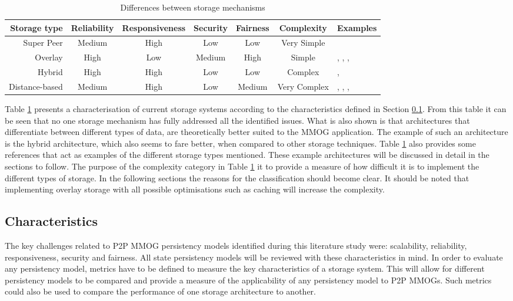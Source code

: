 \documentclass[10pt,a4paper,journal,cspaper,compsoc]{IEEEtran}
\begin{document}
\begin{table}[htbp]
\centering
\begin{tabular}{|r|c|c|c|c|c|l|}
\hline
Storage type & Reliability & Responsiveness & Security & Fairness & Complexity & Examples\\
\hline
Super Peer & Medium & High & Low & Low & Very Simple & \cite{knutsson_p2p_first}\\
Overlay & High & Low & Medium & High & Simple & \cite{Douglas05enablingmassively}, \cite{using_freenet_storage},
\cite{Fan_phd}, \cite{past_storage_focus}\\
Hybrid & High & High & Low & Low & Complex & \cite{zoned_federation}, \cite{hybrid_storage1}\\
Distance-based & Medium & High & Low & Medium & Very Complex & \cite{Buyukkaya_voronoi_state_management}, \cite{Hu_voronoi_IM},
\cite{colyseus_distance_based}, \cite{solipsis}\\
\hline
\end{tabular}
\caption{Differences between storage mechanisms} \label{tab_storage}
\end{table}
%
Table \ref{tab_storage} presents a characterisation of current storage systems according to the characteristics defined in Section
\ref{key_challenges_cm}. From this table it can be seen that no one storage mechanism has fully addressed all the identified issues. What is also
shown is that architectures that differentiate between different types of data, are theoretically better suited to the MMOG application. The example
of such an architecture is the hybrid architecture, which also seems to fare better, when compared to other storage techniques. Table
\ref{tab_storage} also provides some references that act as examples of the different storage types mentioned. These example architectures will be
discussed in detail in the sections to follow. The purpose of the complexity category in Table \ref{tab_storage} it to provide a measure of how
difficult it is to implement the different types of storage. In the following sections the reasons for the classification should become clear. It
should be noted that implementing overlay storage with all possible optimisations such as caching will increase the complexity.

\subsection{Characteristics}
\label{key_challenges_cm}

The key challenges related to P2P MMOG persistency models identified during this literature study were: scalability, reliability, responsiveness,
security and fairness. All state persistency models will be reviewed with these characteristics in mind. In order to evaluate any persistency model,
metrics have to be defined to measure the key characteristics of a storage system. This will allow for different persistency models to be compared
and provide a measure of the applicability of any persistency model to P2P MMOGs. Such metrics could also be used to compare the performance of one
storage architecture to another.
\end{document}
